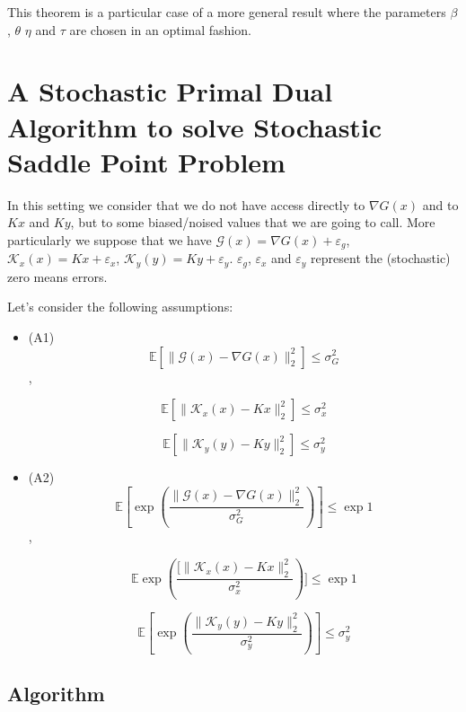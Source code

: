 \documentclass[12pt,reqno]{amsart}
\numberwithin{equation}{section}
\begin{document}
This theorem is a particular case of a more general result where the parameters $\beta$, $\theta$ $\eta$ and $\tau$ are chosen in an optimal fashion.

\section{A Stochastic Primal Dual Algorithm to solve Stochastic Saddle Point Problem}

In this setting we consider that we do not have access directly to $\nabla G(x)$ and to $Kx$ and $Ky$, but to some biased/noised values that we are going to call.
More particularly we suppose that we have $\mathcal{G}(x) = \nabla G(x) + \varepsilon_{g}$, $\mathcal{K}_{x}(x) = Kx + \varepsilon_{x}$, $\mathcal{K}_{y}(y) = Ky + \varepsilon_{y}$.
$\varepsilon_{g}$, $\varepsilon_{x}$ and $\varepsilon_{y}$ represent the (stochastic) zero means errors.

Let's consider the following assumptions:

\begin{itemize}


\item (A1) $$\mathbb{E}[\lVert \mathcal{G}(x) - \nabla G(x) \rVert_{2}^{2}] \leq \sigma_{G}^{2}$$,

$$\mathbb{E}[\lVert \mathcal{K}_{x}(x) - Kx \rVert_{2}^{2}] \leq \sigma_{x}^{2}$$

$$\mathbb{E}[\lVert \mathcal{K}_{y}(y) - Ky \rVert_{2}^{2}] \leq \sigma_{y}^{2}$$

\item (A2) $$\mathbb{E}[\exp(\frac{\lVert \mathcal{G}(x) - \nabla G(x) \rVert_{2}^{2}}{\sigma_{G}^{2}})] \leq \exp{1}$$,

$$\mathbb{E}\exp(\frac{[\lVert \mathcal{K}_{x}(x) - Kx \rVert_{2}^{2}}{\sigma_{x}^{2}})] \leq \exp{1}$$

$$\mathbb{E}[\exp(\dfrac{\lVert \mathcal{K}_{y}(y) - Ky \rVert_{2}^{2}}{\sigma_{y}^{2}})] \leq \sigma_{y}^{2}$$
\end{itemize}


\subsection{Algorithm}
\end{document}

